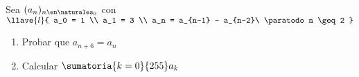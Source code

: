 \begin{enunciado}{\ejExtra}
  Sea $(a_n)_{n \en \naturales_0}$ con
  $\llave{l}{
      a_0 = 1 \\
      a_1 = 3 \\
      a_n = a_{n-1} - a_{n-2}\ \paratodo n \geq 2
    }$\par

  \begin{multicols}{2}
    \begin{enumerate}[label=\alph*)]
      \item Probar que $a_{n+6} = a_n$

      \item Calcular $\sumatoria{k=0}{255} a_k$
    \end{enumerate}
  \end{multicols}
\end{enunciado}


